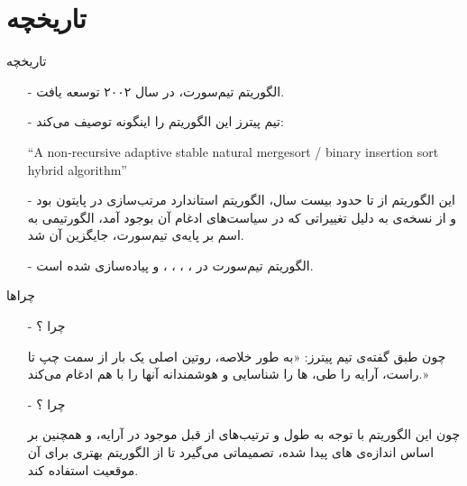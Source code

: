 \section{تاریخچه}
\begin{frame}{تاریخچه}
\begin{itemize}\itemr
\item[-]
الگوریتم تیم‌سورت، در سال ۲۰۰۲ توسعه یافت.

\item[-]
تیم‌ پیترز این الگوریتم را اینگونه توصیف می‌کند:
\begin{flushleft}
\begin{latin}
``A non-recursive adaptive stable natural mergesort / binary insertion sort hybrid algorithm''
\end{latin}
\end{flushleft}

\item[-]
این الگوریتم از 
تا حدود بیست سال، الگوریتم استاندارد مرتب‌سازی در پایتون بود و از نسخه‌ی  
به دلیل تغییراتی که در سیاست‌های ادغام آن بوجود آمد، الگورتیمی به اسم 
بر پایه‌ی تیم‌سورت، جایگزین آن شد.

\item[-]
الگوریتم تیم‌سورت در 
،
،
،
،
 و 
پیاده‌سازی شده است.
\end{itemize}
\end{frame}

\begin{frame}{چراها}
\begin{itemize}\itemr
\item[-]
چرا ؟

چون طبق گفته‌ی تیم پیترز: «به طور خلاصه، روتین اصلی یک بار از سمت چپ تا راست، آرایه را طی، ‌ها را شناسایی و هوشمندانه‌ آنها را با هم ادغام می‌کند.»

\item[-]
چرا ؟

چون این الگوریتم با توجه به طول و ترتیب‌های از قبل موجود در آرایه، و همچنین بر اساس اندازه‌‌ی 
های
پیدا شده، تصمیماتی می‌گیرد تا از الگوریتم بهتری برای آن موقعیت استفاده کند.
\end{itemize}
\end{frame}

